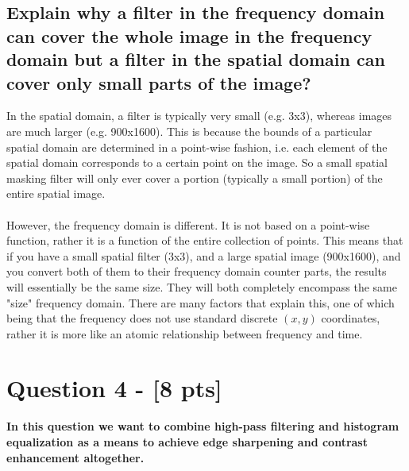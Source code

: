 \documentclass[11pt]{article}
\begin{document}
\subsection{Explain why a filter in the frequency domain can cover the whole image in the frequency domain but a filter in the spatial domain can cover only small parts of the image?}
In the spatial domain, a filter is typically very small (e.g. 3x3), whereas images are much larger (e.g. 900x1600). This is because the bounds of a particular spatial domain are determined in a point-wise fashion, i.e. each element of the spatial domain corresponds to a certain point on the image. So a small spatial masking filter will only ever cover a portion (typically a small portion) of the entire spatial image.\\
\\
However, the frequency domain is different. It is not based on a point-wise function, rather it is a function of the entire collection of points. This means that if you have a small spatial filter (3x3), and a large spatial image (900x1600), and you convert both of them to their frequency domain counter parts, the results will essentially be the same size. They will both completely encompass the same "size" frequency domain. There are many factors that explain this, one of which being that the frequency does not use standard discrete $(x,y)$ coordinates, rather it is more like an atomic relationship between frequency and time.




\section{Question 4 - [8 pts]}
\textbf{In this question we want to combine high-pass filtering and histogram equalization as a means to achieve edge sharpening and contrast enhancement altogether.}\\
\end{document}
